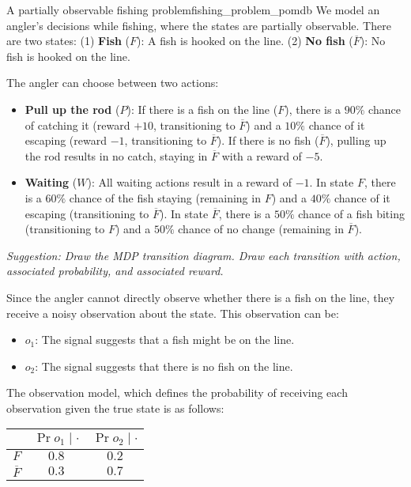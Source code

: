\begin{nexercise}{A partially observable fishing problem}{fishing_problem_pomdb}
  We model an angler's decisions while fishing, where the states are partially observable.
  There are two states: (1) \textbf{Fish} ($F$): A fish is hooked on the line. (2) \textbf{No fish} ($\overline{F}$): No fish is hooked on the line.

  The angler can choose between two actions: \begin{itemize}
    \item \textbf{Pull up the rod} ($P$): If there is a fish on the line ($F$), there is a $90\%$ chance of catching it (reward $+10$, transitioning to $\overline{F}$) and a $10\%$ chance of it escaping (reward $-1$, transitioning to $\overline{F}$).
    If there is no fish ($\overline{F}$), pulling up the rod results in no catch, staying in $\overline{F}$ with a reward of $-5$.

    \item \textbf{Waiting} ($W$): All waiting actions result in a reward of $-1$.
    In state $F$, there is a $60\%$ chance of the fish staying (remaining in $F$) and a $40\%$ chance of it escaping (transitioning to $\overline{F}$).
    In state $\overline{F}$, there is a $50\%$ chance of a fish biting (transitioning to $F$) and a $50\%$ chance of no change (remaining in $\overline{F}$).
  \end{itemize}

  \textit{Suggestion: Draw the MDP transition diagram. Draw each transition with action,  associated probability, and associated reward.}

  Since the angler cannot directly observe whether there is a fish on the line, they receive a noisy observation about the state.
  This observation can be: \begin{itemize}
    \item $o_1$: The signal suggests that a fish might be on the line.
    \item $o_2$: The signal suggests that there is no fish on the line.
  \end{itemize}
  The observation model, which defines the probability of receiving each observation given the true state is as follows:

  \vspace{5pt}
  \begin{center}
    \begin{tabular}{lcc}
      \toprule
      & $\Pr{o_1 \mid \cdot}$ & $\Pr{o_2 \mid \cdot}$ \\
      \midrule
      $F$ & $0.8$ & $0.2$ \\
      $\overline{F}$ & $0.3$ & $0.7$ \\
      \bottomrule
    \end{tabular}
  \end{center}
  \vspace{5pt}


\end{nexercise}
